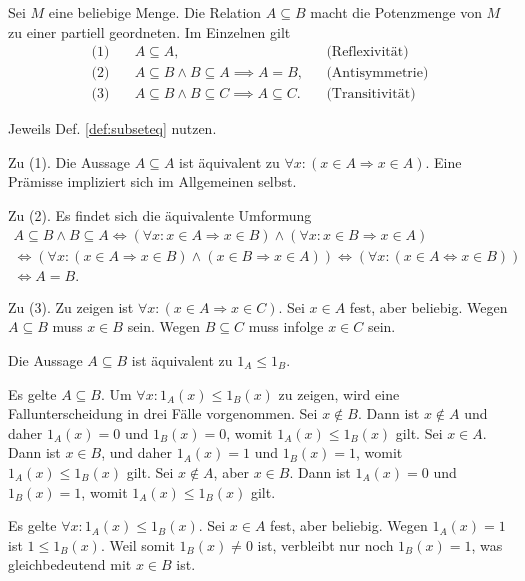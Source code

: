 \begin{Satz}
Sei $M$ eine beliebige Menge. Die Relation $A\subseteq B$ macht die
Potenzmenge von $M$ zu einer partiell geordneten.
Im Einzelnen gilt%
\begin{align*}
\text{(1)}\quad & A\subseteq A, && \text{(Reflexivität)}\\
\text{(2)}\quad & A\subseteq B\land B\subseteq A \implies A = B, && \text{(Antisymmetrie)}\\
\text{(3)}\quad & A\subseteq B\land B\subseteq C \implies A\subseteq C. && \text{(Transitivität)}
\end{align*}
\end{Satz}
\begin{Beweis}
Jeweils Def. \ref{def:subseteq} nutzen.

Zu (1). Die Aussage $A\subseteq A$ ist 
äquivalent zu $\forall x\colon (x\in A\Rightarrow x\in A)$.
Eine Prämisse impliziert sich im Allgemeinen selbst.

Zu (2). Es findet sich die äquivalente Umformung
\begin{gather*}
A\subseteq B\land B\subseteq A\iff
(\forall x\colon x\in A\Rightarrow x\in B)
\land (\forall x\colon x\in B\Rightarrow x\in A)\\
\iff (\forall x\colon (x\in A\Rightarrow x\in B)\land (x\in B\Rightarrow x\in A))
\iff (\forall x\colon (x\in A\Leftrightarrow x\in B))\\
\iff A = B.
\end{gather*}

Zu (3). Zu zeigen ist $\forall x\colon (x\in A\Rightarrow x\in C)$.
Sei $x\in A$ fest, aber beliebig. Wegen $A\subseteq B$ muss $x\in B$
sein. Wegen $B\subseteq C$ muss infolge $x\in C$ sein.\,\qedsymbol
\end{Beweis}

\begin{Satz}
Die Aussage $A\subseteq B$ ist äquivalent zu $1_A\le 1_B$.
\end{Satz}
\begin{Beweis}
Es gelte $A\subseteq B$. Um $\forall x\colon 1_A(x)\le 1_B(x)$ zu
zeigen, wird eine Fallunterscheidung in drei Fälle vorgenommen.
Sei $x\notin B$. Dann ist $x\notin A$
und daher $1_A(x)=0$ und $1_B(x)=0$, womit $1_A(x)\le 1_B(x)$ gilt.
Sei $x\in A$. Dann ist $x\in B$, und daher $1_A(x)=1$ und $1_B(x)=1$,
womit $1_A(x)\le 1_B(x)$ gilt.
Sei $x\notin A$, aber $x\in B$. Dann ist $1_A(x)=0$ und $1_B(x)=1$,
womit $1_A(x)\le 1_B(x)$ gilt.

Es gelte $\forall x\colon 1_A(x)\le 1_B(x)$. Sei $x\in A$ fest,
aber beliebig. Wegen $1_A(x)=1$ ist $1\le 1_B(x)$. Weil somit
$1_B(x)\ne 0$ ist, verbleibt nur noch $1_B(x)=1$, was
gleichbedeutend mit $x\in B$ ist.\,\qedsymbol
\end{Beweis}

